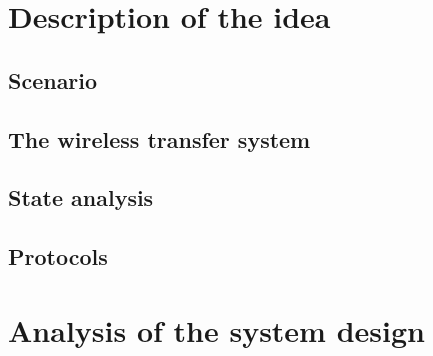 \documentclass[a4paper, 10pt]{article}
\begin{document}


\section{Description of the idea}
\label{sec:idea}


\subsection{Scenario}
\label{sec:scenario}


\subsection{The wireless transfer system}
\label{sec:realize}


\subsection{State analysis}
\label{sec:states}


\subsection{Protocols}
\label{sec:proto}



\section{Analysis of the system design}
\label{sec:analysis}

\end{document}
